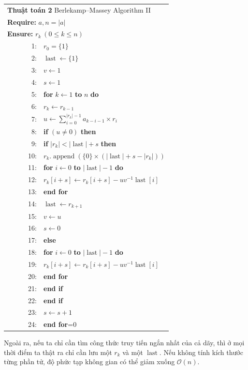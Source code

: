 \documentclass[11pt]{article}
\newcommand{\Oh}{\mathcal{O}}
\newcommand{\last}{\operatorname{last}}
\newcommand{\append}{\operatorname{append}}
\begin{document}
\begin{center}
\small
\begin{tabular}{r@{\quad}p{0.78\linewidth}}
\multicolumn{2}{l}{\textbf{Thuật toán 2} Berlekamp--Massey Algorithm II}\\
\multicolumn{2}{l}{\textbf{Require:} \(a, n=|a|\)}\\
\multicolumn{2}{l}{\textbf{Ensure:} \(r_k\ (0\le k\le n)\)}\\
1: & \(r_0=\{1\}\)\\
2: & \(\last\gets\{1\}\)\\
3: & \(v\gets 1\)\\
4: & \(s\gets 1\)\\
5: & \textbf{for} \(k\gets 1\) \textbf{to} \(n\) \textbf{do}\\
6: & \quad \(r_k\gets r_{k-1}\)\\
7: & \quad \(u\gets\sum_{i=0}^{|r_k|-1}a_{k-i-1}\times r_i\)\\
8: & \quad \textbf{if} \((u\ne 0)\) \textbf{then}\\
9: & \qquad \textbf{if} \(|r_k|<|\last|+s\) \textbf{then}\\
10: & \qquad\quad \(r_k.\append(\{0\}\times(|\last|+s-|r_k|))\)\\
11: & \qquad\quad \textbf{for} \(i\gets 0\) \textbf{to} \(|\last|-1\)
       \textbf{do}\\
12: & \qquad\qquad \(r_k[i+s]\gets r_k[i+s]-uv^{-1}\last[i]\)\\
13: & \qquad\quad \textbf{end for}\\
14: & \qquad\quad \(\last\gets r_{k+1}\)\\
15: & \qquad\quad \(v\gets u\)\\
16: & \qquad\quad \(s\gets 0\)\\
17: & \qquad \textbf{else}\\
18: & \qquad\quad \textbf{for} \(i\gets 0\) \textbf{to} \(|\last|-1\)
       \textbf{do}\\
19: & \qquad\qquad \(r_k[i+s]\gets r_k[i+s]-uv^{-1}\last[i]\)\\
20: & \qquad\quad \textbf{end for}\\
21: & \qquad \textbf{end if}\\
22: & \quad \textbf{end if}\\
23: & \quad \(s\gets s+1\)\\
24: & \textbf{end for}=0
\end{tabular}
\end{center}

Ngoài ra, nếu ta chỉ cần tìm công thức truy tiến ngắn nhất của cả dãy, thì ở
mọi thời điểm ta thật ra chỉ cần lưu một \(r_k\) và một \(\last\). Nếu không
tính kích thước từng phần tử, độ phức tạp không gian có thể giảm xuống
\(\Oh(n)\).
\end{document}
